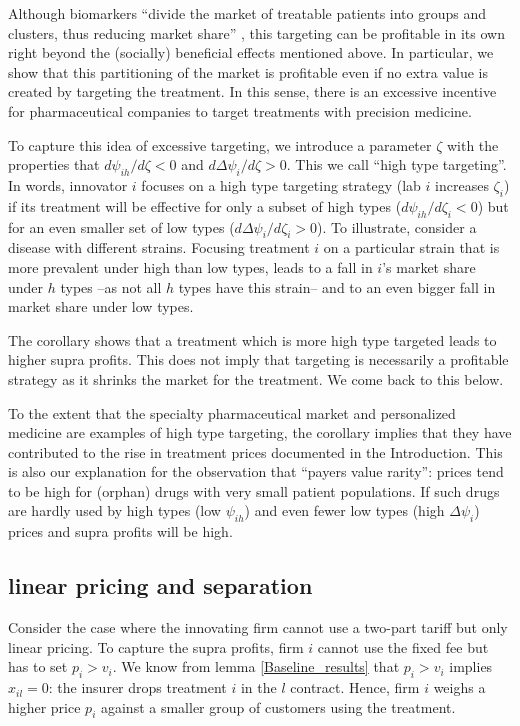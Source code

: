 \documentclass[a4paper,12pt]{article}
\begin{document}
Although biomarkers ``divide the market of treatable patients into groups and clusters, thus reducing market share'' \citep{jakka13_econom_persp_person_medic}, this targeting can be profitable in its own right beyond the (socially) beneficial effects mentioned above. In particular, we show that this partitioning of the market is profitable even if no extra value is created by targeting the treatment. In this sense, there is an excessive incentive for pharmaceutical companies to target treatments with precision medicine.

To capture this idea of excessive targeting, we introduce a parameter \(\zeta\) with the properties that \(d\psi_{ih}/d\zeta <0\) and \(d\Delta \psi_i/d\zeta>0\). This we call ``high type targeting''. In words, innovator \(i\) focuses on a high type targeting strategy (lab \(i\) increases \(\zeta_i\)) if its treatment will be effective for only a subset of high types (\(d\psi_{ih}/d\zeta_i <0\)) but for an even smaller set of low types (\(d\Delta\psi_i/d\zeta_i>0\)). To illustrate, consider a disease with different strains. Focusing treatment \(i\) on a particular strain that is more prevalent under high than low types, leads to a fall in \(i\)'s market share under \(h\) types --as not all \(h\) types have this strain-- and to an even bigger fall in market share under low types.

The corollary shows that a treatment which is more high type targeted leads to higher supra profits. This does not imply that targeting is necessarily a profitable strategy as it shrinks the market for the treatment. We come back to this below.

To the extent that the specialty pharmaceutical market and  personalized medicine are examples of high type targeting, the corollary implies that they have contributed to the rise in treatment prices documented in the Introduction. This is also our explanation for the observation that ``payers value rarity'': prices tend to be high for (orphan) drugs with very small patient populations. If such drugs are hardly used by high types (low \(\psi_{ih}\)) and even fewer low types (high \(\Delta \psi_i\)) prices and supra profits will be high.

\subsection{linear pricing and separation}
\label{sec:org1829515}

Consider the case where the innovating firm cannot use a two-part tariff but only linear pricing. To capture the supra profits, firm \(i\) cannot use the fixed fee but has to set \(p_i > v_i\). We know from lemma \ref{Baseline_results} that \(p_i>v_i\) implies \(x_{il}=0\): the insurer drops treatment \(i\) in the \(l\) contract. Hence, firm \(i\) weighs a higher price \(p_i\) against a smaller group of customers using the treatment.
\end{document}
